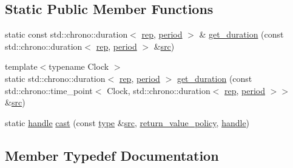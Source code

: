 \subsection*{Static Public Member Functions}
\begin{DoxyCompactItemize}
\item 
static const std\+::chrono\+::duration$<$ \mbox{\hyperlink{classduration__caster_aa56a3f1e4b4c1651fbe0b52f9575e1bd}{rep}}, \mbox{\hyperlink{classduration__caster_ac22f4732d7e0b975d5c5d2e82a7635c4}{period}} $>$ \& \mbox{\hyperlink{classduration__caster_ad36a0673aec0ea43023763e9680eb88c}{get\+\_\+duration}} (const std\+::chrono\+::duration$<$ \mbox{\hyperlink{classduration__caster_aa56a3f1e4b4c1651fbe0b52f9575e1bd}{rep}}, \mbox{\hyperlink{classduration__caster_ac22f4732d7e0b975d5c5d2e82a7635c4}{period}} $>$ \&\mbox{\hyperlink{_s_d_l__opengl__glext_8h_a72e0fdf0f845ded60b1fada9e9195cd7}{src}})
\item 
{\footnotesize template$<$typename Clock $>$ }\\static std\+::chrono\+::duration$<$ \mbox{\hyperlink{classduration__caster_aa56a3f1e4b4c1651fbe0b52f9575e1bd}{rep}}, \mbox{\hyperlink{classduration__caster_ac22f4732d7e0b975d5c5d2e82a7635c4}{period}} $>$ \mbox{\hyperlink{classduration__caster_aed28187c877e7c2e084ba5c1c4d0f9be}{get\+\_\+duration}} (const std\+::chrono\+::time\+\_\+point$<$ Clock, std\+::chrono\+::duration$<$ \mbox{\hyperlink{classduration__caster_aa56a3f1e4b4c1651fbe0b52f9575e1bd}{rep}}, \mbox{\hyperlink{classduration__caster_ac22f4732d7e0b975d5c5d2e82a7635c4}{period}} $>$$>$ \&\mbox{\hyperlink{_s_d_l__opengl__glext_8h_a72e0fdf0f845ded60b1fada9e9195cd7}{src}})
\item 
static \mbox{\hyperlink{classhandle}{handle}} \mbox{\hyperlink{classduration__caster_a84c3172d12565e8d1921801f1cc5a698}{cast}} (const \mbox{\hyperlink{_s_d_l__opengl_8h_ad5ddf6fca7b585646515660e810e0188}{type}} \&\mbox{\hyperlink{_s_d_l__opengl__glext_8h_a72e0fdf0f845ded60b1fada9e9195cd7}{src}}, \mbox{\hyperlink{detail_2common_8h_adde72ab1fb0dd4b48a5232c349a53841}{return\+\_\+value\+\_\+policy}}, \mbox{\hyperlink{classhandle}{handle}})
\end{DoxyCompactItemize}


\subsection{Member Typedef Documentation}
\mbox{\label{classduration__caster_a04fee4c68761f22d238c731c4a89e150}} 
